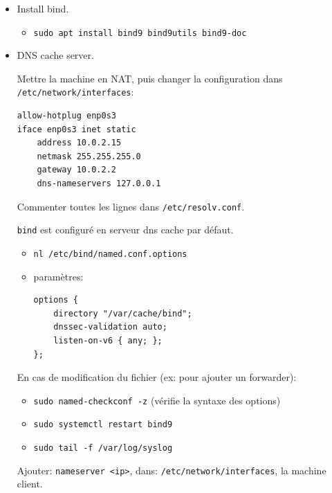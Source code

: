 \documentclass[a4paper]{article}
\begin{document}
\begin{itemize}

\item Install bind.
\begin{example}
    \begin{itemize}
        \item \texttt{sudo apt install bind9 bind9utils bind9-doc}
    \end{itemize}
\end{example}

\item DNS cache server.
\begin{example}
    Mettre la machine en NAT, puis changer la configuration dans \texttt{/etc/network/interfaces}:
    \begin{verbatim}
allow-hotplug enp0s3
iface enp0s3 inet static
    address 10.0.2.15
    netmask 255.255.255.0
    gateway 10.0.2.2
    dns-nameservers 127.0.0.1
    \end{verbatim}
    Commenter toutes les lignes dans \texttt{/etc/resolv.conf}. \\
\end{example}
\begin{example}
    \texttt{bind} est configuré en serveur dns cache par défaut.
    \begin{itemize}
        \item \texttt{nl /etc/bind/named.conf.options}
        \item paramètres:
        \begin{verbatim}
options {
    directory "/var/cache/bind";
    dnssec-validation auto;
    listen-on-v6 { any; };
};
        \end{verbatim}
    \end{itemize}
    En cas de modification du fichier (ex: pour ajouter un forwarder):
    \begin{itemize}
        \item \texttt{sudo named-checkconf -z} (vérifie la syntaxe des options)
        \item \texttt{sudo systemctl restart bind9}
        \item \texttt{sudo tail -f /var/log/syslog}
    \end{itemize}
    Ajouter: \texttt{nameserver <ip>}, dans: \texttt{/etc/network/interfaces}, la machine client.
\end{example}


\end{itemize}
\end{document}
